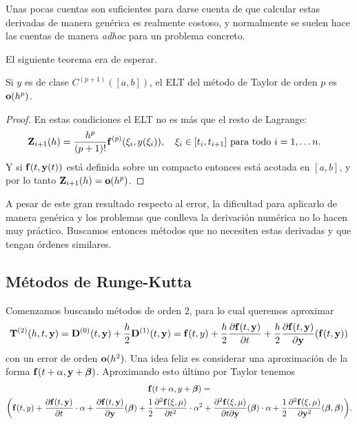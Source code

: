 Unas pocas cuentas son suficientes para darse cuenta de que
calcular estas derivadas de manera genérica es realmente costoso,
y normalmente se suelen hace las cuentas de manera \emph{adhoc}
para un problema concreto.


El siguiente teorema era de esperar.

\begin{theorem}
    Si $y$ es de clase $C^{(p+1)}([a, b])$,
    el ELT del método de Taylor de orden $p$ es $\vb{o}(h^p)$.
\end{theorem}

\begin{proof}
    En estas condiciones el ELT no es más que el resto de Lagrange:
    \begin{equation*}
        \ELT_{i+1}(h) = \frac{h^p}{(p+1)!} \vf^{(p)}(\xi_i, y(\xi_i)),
            \qq{$\xi_i \in [t_i, t_{i+1}]$ para todo $i = 1,\ldots n$.}
    \end{equation*}
    Y si $\vb{f}(t, \vb{y}(t))$ está definida sobre un compacto
    entonces está acotada en $[a, b]$,
    y por lo tanto $\vb{Z}_{i+1}(h) = \vb{o}(h^p)$.
\end{proof}

A pesar de este gran resultado respecto al error,
la dificultad para aplicarlo de manera genérica y
los problemas que conlleva la derivación numérica no lo hacen muy práctico.
Buscamos entonces métodos que no necesiten estas derivadas
y que tengan órdenes similares.

\subsection{Métodos de Runge-Kutta}

\newcommand{\vbeta}{\vb*{\beta}}

Comenzamos buscando métodos de orden $2$,
para lo cual queremos aproximar
\begin{equation*}
    \vb{T}^{(2)}(h, t, \vb{y}) =
    \vb{D}^{(0)}(t, \vb{y}) + \frac{h}{2} \vb{D}^{(1)}(t, \vb{y}) =
    \vb{f}(t,y) + \frac{h}{2}\pdv{\vb{f}(t, \vb{y})}{t} +
        \frac{h}{2}\pdv{\vb{f}(t, \vb{y})}{\vb{y}}\qty(\vb{f}(t, \vb{y}))
\end{equation*}
con un error de orden $\vb{o}(h^2)$.
Una idea feliz es considerar una aproximación de la forma
$\vf(t + \alpha, \vy + \vbeta)$.
Aproximando esto último por Taylor tenemos
\begin{multline*}
    \vf(t + \alpha, y + \vbeta) = \\
    \qty(
        \vf(t,y) +
        \pdv{\vf(t, \vy)}{t} \cdot \alpha +
        \pdv{\vf(t, \vy)}{\vy} \qty(\vbeta) +
        \frac{1}{2}\pdv[2]{\vf(\xi, \mu)}{t} \cdot \alpha^2 +
        \pdv{\vf(\xi, \mu)}{t}{\vy} \qty(\vbeta) \cdot \alpha +
        \frac{1}{2}\pdv[2]{\vf(\xi, \mu)}{\vy} \qty(\vbeta, \vbeta)
    ).
\end{multline*}

